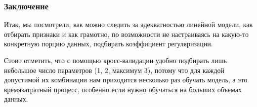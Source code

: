 \documentclass[11pt]{article}
\begin{document}
    \hypertarget{ux437ux430ux43aux43bux44eux447ux435ux43dux438ux435}{%
\subsubsection{Заключение}\label{ux437ux430ux43aux43bux44eux447ux435ux43dux438ux435}}

Итак, мы посмотрели, как можно следить за адекватностью линейной модели,
как отбирать признаки и как грамотно, по возможности не настраиваясь на
какую-то конкретную порцию данных, подбирать коэффициент регуляризации.

Стоит отметить, что с помощью кросс-валидации удобно подбирать лишь
небольшое число параметров (1, 2, максимум 3), потому что для каждой
допустимой их комбинации нам приходится несколько раз обучать модель, а
это времязатратный процесс, особенно если нужно обучаться на больших
объемах данных.


    
    
    
    
\end{document}
